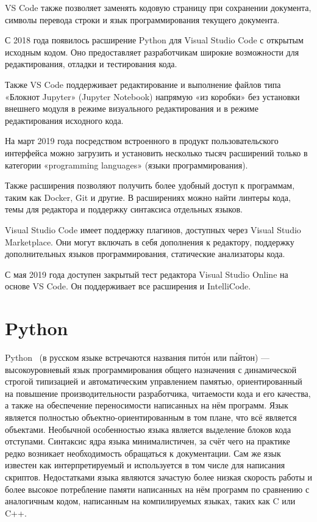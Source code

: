 VS Code также позволяет заменять кодовую страницу при сохранении документа, символы перевода строки и язык программирования текущего документа.

С 2018 года появилось расширение Python для Visual Studio Code с открытым исходным кодом. Оно предоставляет разработчикам широкие возможности для редактирования, отладки и тестирования кода.

Также VS Code поддерживает редактирование и выполнение файлов типа «Блокнот Jupyter» (Jupyter Notebook) напрямую «из коробки» без установки внешнего модуля в режиме визуального редактирования и в режиме редактирования исходного кода.

На март 2019 года посредством встроенного в продукт пользовательского интерфейса можно загрузить и установить несколько тысяч расширений только в категории «programming languages» (языки программирования).

Также расширения позволяют получить более удобный доступ к программам, таким как Docker, Git и другие. В расширениях можно найти линтеры кода, темы для редактора и поддержку синтаксиса отдельных языков.

Visual Studio Code имеет поддержку плагинов, доступных через Visual Studio Marketplace. Они могут включать в себя дополнения к редактору, поддержку дополнительных языков программирования, статические анализаторы кода.

С мая 2019 года доступен закрытый тест редактора Visual Studio Online на основе VS Code. Он поддерживает все расширения и IntelliCode.
\section{Python}
Python~\cite{wikiPy} (в русском языке встречаются названия пито́н или па́йтон) — высокоуровневый язык программирования общего назначения с динамической строгой типизацией и автоматическим управлением памятью, ориентированный на повышение производительности разработчика, читаемости кода и его качества, а также на обеспечение переносимости написанных на нём программ. Язык является полностью объектно-ориентированным в том плане, что всё является объектами. Необычной особенностью языка является выделение блоков кода отступами. Синтаксис ядра языка минималистичен, за счёт чего на практике редко возникает необходимость обращаться к документации. Сам же язык известен как интерпретируемый и используется в том числе для написания скриптов. Недостатками языка являются зачастую более низкая скорость работы и более высокое потребление памяти написанных на нём программ по сравнению с аналогичным кодом, написанным на компилируемых языках, таких как C или C++.

